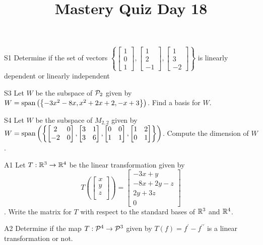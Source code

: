 \documentclass{sbgLAquiz}
\title{Mastery Quiz Day 18 }
\begin{document}
\begin{problem}{S1}
Determine if the set of vectors  $\left\{\begin{bmatrix} 1 \\ 0 \\ 1 \end{bmatrix}, \begin{bmatrix} 1 \\ 2 \\ -1 \end{bmatrix}, \begin{bmatrix} 1 \\ 3 \\ -2 \end{bmatrix}\right\}$ is  linearly dependent or linearly independent
\end{problem}

\begin{problem}{S3}
Let $W$ be the subspace of $\P_2$ given by $W = {\rm span} \left( \left\{  -3x^2-8x, x^2+2x+2, -x+3\right\} \right)$.   Find a basis for $W$.
\end{problem}
\newpage

\begin{problem}{S4}
Let $W$ be the subspace of $M_{2,2}$ given by $W={\rm span}\left(\left\{\begin{bmatrix} 2 & 0 \\ -2 & 0 \end{bmatrix}, \begin{bmatrix} 3 & 1 \\ 3 & 6 \end{bmatrix}, \begin{bmatrix} 0 & 0 \\ 1 & 1 \end{bmatrix}, \begin{bmatrix}1 & 2 \\ 0 & 1 \end{bmatrix}\right\}\right)$. Compute the dimension of $W$.
\end{problem}

\begin{problem}{A1}
Let $T: \IR^3\rightarrow \IR^4$ be the linear transformation given by $$T\left(\begin{bmatrix} x \\ y \\ z \\  \end{bmatrix} \right) = \begin{bmatrix} -3x+y \\ -8x+2y-z \\ 2y+3z \\ 0 \end{bmatrix}$$.  Write the matrix for $T$ with respect to the standard bases of $\IR^3$ and $\IR^4$.
\end{problem}
\newpage

\begin{problem}{A2}
Determine if the map $T: \P ^4 \rightarrow \P^3$ given by $T(f) = f^{\prime}-f^{\prime \prime}$ is a linear transformation or not.
\end{problem}
\end{document}
